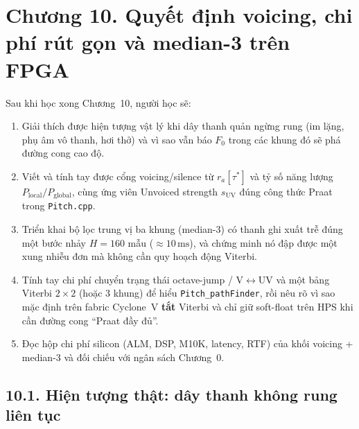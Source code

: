 \clearpage
{}
\section*{Chương 10. Quyết định voicing, chi phí rút gọn và median-3 trên FPGA}

\begin{learningobj}
Sau khi học xong Chương~10, người học sẽ:
\begin{enumerate}[leftmargin=1.4em]
    \item Giải thích được hiện tượng vật lý khi dây thanh quản ngừng rung (im lặng, phụ âm vô thanh, hơi thở) và vì sao vẫn báo $F_0$ trong các khung đó sẽ phá đường cong cao độ.
    \item Viết và tính tay được cổng voicing/silence từ $r_a[\tau^*]$ và tỷ số năng lượng $P_{\mathrm{local}}/P_{\mathrm{global}}$, cùng ứng viên Unvoiced strength $s_{\mathrm{UV}}$ đúng công thức Praat trong \texttt{Pitch.cpp}.
    \item Triển khai bộ lọc trung vị ba khung (median-3) có thanh ghi xuất trễ đúng một bước nhảy $H=160$ mẫu ($\approx 10\,\text{ms}$), và chứng minh nó đập được một xung nhiễu đơn mà không cần quy hoạch động Viterbi.
    \item Tính tay chi phí chuyển trạng thái octave-jump / V$\leftrightarrow$UV và một bảng Viterbi $2\times 2$ (hoặc $3$ khung) để hiểu \texttt{Pitch\_pathFinder}, rồi nêu rõ vì sao mặc định trên fabric Cyclone~V \textbf{tắt} Viterbi và chỉ giữ soft-float trên HPS khi cần đường cong ``Praat đầy đủ''.
    \item Đọc hộp chi phí silicon (ALM, DSP, M10K, latency, RTF) của khối voicing + median-3 và đối chiếu với ngân sách Chương~0.
\end{enumerate}
\end{learningobj}

\subsection*{10.1. Hiện tượng thật: dây thanh không rung liên tục}


